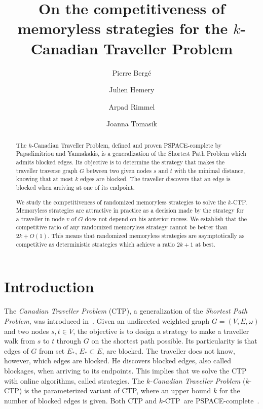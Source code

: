 \documentclass[preprint]{elsarticle}
\newcommand{\kctp}{$k$-CTP}
\begin{document}
\title{On the competitiveness of memoryless strategies for the $k$-Canadian Traveller Problem}
\author[upsud]{Pierre Berg\'e }
\author[cs]{Julien Hemery}
\author[cs]{Arpad Rimmel}
\author[cs]{Joanna Tomasik}
\address[upsud]{LRI, Universit\'e Paris-Sud, Universit\'e Paris-Saclay, 91405 Orsay Cedex, France}
\address[cs]{LRI, CentraleSup\' elec, Universit\'e Paris-Saclay, 91405 Orsay Cedex, France}

\begin{abstract}
The $k$-Canadian Traveller Problem, defined and proven PSPACE-complete by Papadimitriou and Yannakakis, is a generalization of the Shortest Path Problem which admits blocked edges. Its objective is to determine the strategy that makes the traveller traverse graph $G$ between two given nodes $s$ and $t$ with the minimal distance, knowing that at most $k$ edges are blocked. The traveller discovers that an edge is blocked when arriving at one of its endpoint. 
 
We study the competitiveness of randomized memoryless strategies to solve the \kctp . Memoryless strategies are attractive in practice as a decision made by the strategy for a traveller in node $v$ of $G$ does not depend on his anterior moves. We establish that the competitive ratio of any randomized memoryless strategy cannot be better than $2k + O\left(1\right)$. This means that randomized memoryless strategies are asymptotically as competitive as deterministic strategies which achieve a ratio $2k+1$ at best.
\end{abstract}

\maketitle


\section{Introduction}

The \textit{Canadian Traveller Problem} (CTP), a generalization of the \textit{Shortest Path Problem}, was introduced in~\cite{PaYa91}. Given an undirected weighted graph $G=(V,E,\omega)$ and two nodes $s,t \in V$, the objective is to design a strategy to make a traveller walk from $s$ to $t$ through $G$ on the shortest path possible. Its particularity is that edges of $G$ from set $E_*$, $E_* \subset E$, are blocked. The traveller does not know, however, which edges are blocked. He discovers blocked edges, also called blockages, when arriving to its endpoints. This implies that we solve the CTP with online algorithms, called strategies. The $k$-\textit{Canadian Traveller Problem} (\kctp) is the parameterized variant of CTP, where an upper bound $k$ for the number of blocked edges is given. Both CTP and \kctp ~are PSPACE-complete~\cite{BaSc91,PaYa91}.
\end{document}
